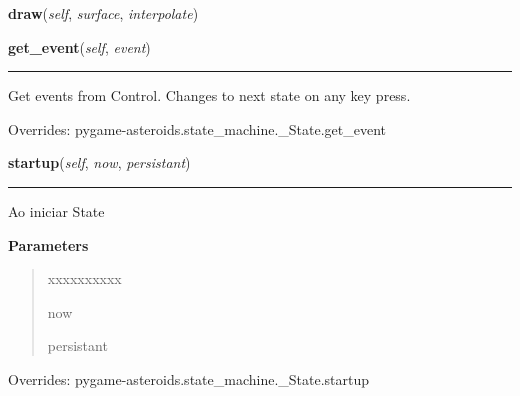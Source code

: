     \label{pygame-asteroids:states:menu:Menu:draw}

    \vspace{0.5ex}

\hspace{.8\funcindent}\begin{boxedminipage}{\funcwidth}

    \raggedright \textbf{draw}(\textit{self}, \textit{surface}, \textit{interpolate})

\setlength{\parskip}{2ex}
\setlength{\parskip}{1ex}
    \end{boxedminipage}

    \vspace{0.5ex}

\hspace{.8\funcindent}\begin{boxedminipage}{\funcwidth}

    \raggedright \textbf{get\_event}(\textit{self}, \textit{event})

    \vspace{-1.5ex}

    \rule{\textwidth}{0.5\fboxrule}
\setlength{\parskip}{2ex}
    Get events from Control. Changes to next state on any key press.

\setlength{\parskip}{1ex}
      Overrides: pygame-asteroids.state\_machine.\_State.get\_event

    \end{boxedminipage}

    \vspace{0.5ex}

\hspace{.8\funcindent}\begin{boxedminipage}{\funcwidth}

    \raggedright \textbf{startup}(\textit{self}, \textit{now}, \textit{persistant})

    \vspace{-1.5ex}

    \rule{\textwidth}{0.5\fboxrule}
\setlength{\parskip}{2ex}
    Ao iniciar State

\setlength{\parskip}{1ex}
      \textbf{Parameters}
      \vspace{-1ex}

      \begin{quote}
        \begin{Ventry}{xxxxxxxxxx}

          \item[now]

          \item[persistant]

        \end{Ventry}

      \end{quote}

      Overrides: pygame-asteroids.state\_machine.\_State.startup

    \end{boxedminipage}


